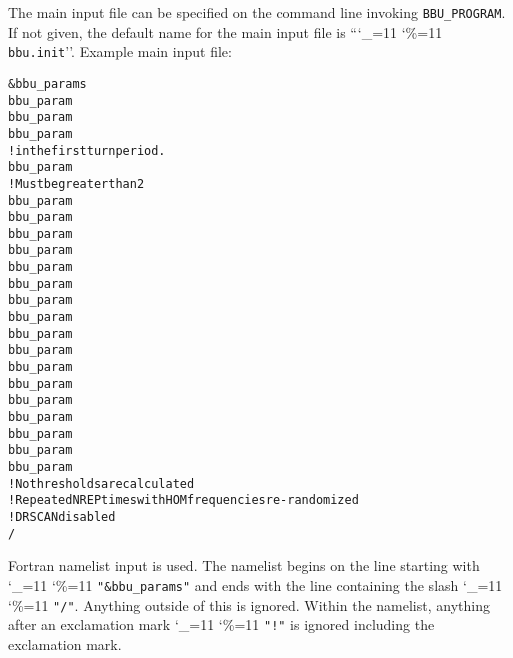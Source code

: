 \documentclass[11pt]{article}
\newcommand{\bbup}{\texttt{BBU_PROGRAM}\xspace}
\newcommand\ttcmd{\begingroup\catcode`\_=11 \catcode`\%=11 \dottcmd}
\newcommand\dottcmd[1]{\texttt{#1}\endgroup}
\newcommand{\vn}{\ttcmd}
\newlength{\ExBeg}
\newlength{\ExEnd}
\newenvironment{example}
  {\vspace{\ExBeg} \begin{alltt}}
  {\end{alltt} \vspace{\ExEnd}}
\begin{document}
The main input file can be specified on the command line invoking {\bbup}.
If not given, the default name for the main input file is ``\vn{bbu.init}''.
Example main input file:
\begin{example}
&bbu_params
  bbu_param%
  bbu_param%
  bbu_param%
                                              !  in the first turn period.
  bbu_param%
                                              ! Must be greater than 2
  bbu_param%
  bbu_param%
  bbu_param%
  bbu_param%
  bbu_param%
  bbu_param%
  bbu_param%
  bbu_param%
  bbu_param%
  bbu_param%
  bbu_param%
  bbu_param%
  bbu_param%
  bbu_param%
  bbu_param%
  bbu_param%
  bbu_param%
                                              ! No thresholds are calculated
                                              ! Repeated NREP times with HOM frequencies re-randomized
                                              ! DRSCAN disabled
/
\end{example}
Fortran namelist input is used.
The namelist begins on the line starting with \vn{"\&bbu_params"}
and ends with the line containing the slash \vn{"/"}. Anything outside
of this is ignored. Within the namelist, anything after an exclamation
mark \vn{"!"} is ignored including the exclamation mark. 
\end{document}
